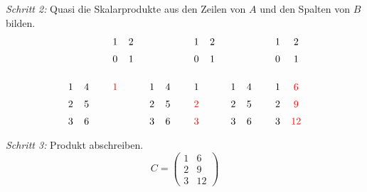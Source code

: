 \vbox{
\emph{Schritt 2:} Quasi die Skalarprodukte aus den Zeilen von $A$ und den Spalten von $B$ bilden.
\[
\xySep{5pt}\xymatrix{
                &   & \,\ar@{-}[ddddd] & 1\ar@{..>}[ddd] & 2\\
                &   &                  & 0               & 1\\
\,\ar@{-}[rrrr] &   &                  &                 & \,\\
1\ar@{..>}[rrr] & 4 &                  & {\color{red}1}\\
2               & 5\\
3               & 6 & \,
}
%
\quad
%
\xySep{5pt}
\xymatrix{
                &   & \,\ar@{-}[ddddd] & 1\ar@{..}[ddddd] & 2 \\
                &   &                  & 0                & 1 \\
\,\ar@{-}[rrrr] &   &                  &                  & \,\\
1               & 4 &                  & 1                    \\
2\ar@{..}[rrr]  & 5 &                  & {\color{red}2}       \\
3\ar@{..}[rrr]  & 6 & \,               & {\color{red}3}
}
%
\quad
%
\xySep{5pt}
\xymatrix{
                &   & \,\ar@{-}[ddddd] & 1 & 2\ar@{..}[ddddd]\\
                &   &                  & 0 & 1               \\
\,\ar@{-}[rrrr] &   &                  &   & \,              \\
1\ar@{..}[rrrr] & 4 &                  & 1 & {\color{red}6}  \\
2\ar@{..}[rrrr] & 5 &                  & 2 & {\color{red}9}  \\
3\ar@{..}[rrrr] & 6 & \,               & 3 & {\color{red}12}
}
\]
}

\bigskip{}

\vbox{
\emph{Schritt 3:} Produkt abschreiben.
\[
C = \begin{pmatrix}
  1 & 6\\
  2 & 9\\
  3 & 12
\end{pmatrix}
\]
}



